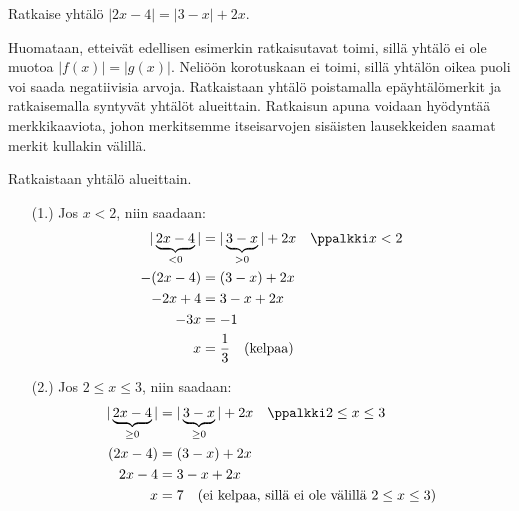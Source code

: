 \begin{esimerkki}
Ratkaise yhtälö $|2x-4|=|3-x|+2x$.

\begin{esimratk}
Huomataan, etteivät edellisen esimerkin ratkaisutavat toimi, sillä yhtälö ei ole muotoa $|f(x)|=|g(x)|$. Neliöön korotuskaan ei toimi, sillä yhtälön oikea puoli voi saada negatiivisia arvoja. Ratkaistaan yhtälö poistamalla epäyhtälömerkit ja ratkaisemalla syntyvät yhtälöt alueittain. Ratkaisun apuna voidaan hyödyntää merkkikaaviota, johon merkitsemme itseisarvojen sisäisten lausekkeiden saamat merkit kullakin välillä.

\begin{lukusuora}{0}{4}{4}
\end{lukusuora}
\begin{lukusuora}{1}{5}{4}
\end{lukusuora}

\begin{center}
\begin{merkkikaavio}{2}

	\merkkikaavioMerkki{$-$}
	\merkkikaavioMerkki{$+$}
	\merkkikaavioMerkki{$+$}

\merkkikaavioUusirivi
	\merkkikaavioMerkki{$+$}
	\merkkikaavioMerkki{$+$}
	\merkkikaavioMerkki{$-$}

\end{merkkikaavio}
\end{center}

Ratkaistaan yhtälö alueittain.
\begin{itemize}
\item[(1.)] Jos $x<2$, niin saadaan:
\begin{align*}
|\underbrace{2x-4}_{<0}|&=|\underbrace{3-x}_{>0}|+2x \quad \ppalkki x<2  \\
-(2x-4)&=(3-x)+2x \\
-2x+4&=3-x+2x \\
-3x &= -1 \\
x &= \frac{1}{3} \quad \text{(kelpaa)}
\end{align*}

\item[(2.)] Jos $2\leq x\leq 3$, niin saadaan:
\begin{align*}
	|\underbrace{2x-4}_{\geq0}|&=|\underbrace{3-x}_{\geq0}|+2x \quad \ppalkki 2\leq x\leq 3  \\
	(2x-4)&=(3-x)+2x \\
	2x-4&=3-x+2x \\
	x &= 7 \quad \text{(ei kelpaa, sillä ei ole välillä $2\leq x\leq 3$)}
\end{align*}


\end{itemize}
\end{esimratk}
\end{esimerkki}
